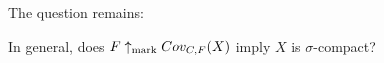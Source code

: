   The question remains:

  \begin{question}
    In general, does $F \uparrow_{\text{mark}} Cov_{C,F}(X)$ imply $X$ is $\sigma$-compact?
  \end{question}


